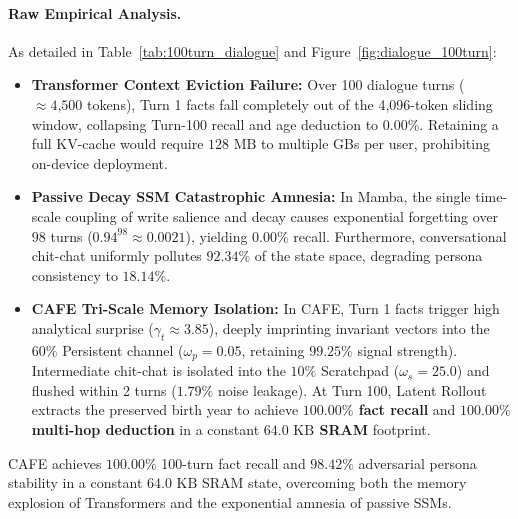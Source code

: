 \begin{table}[t]
\centering
\small
\caption{\textbf{100-Turn Long-Horizon Conversational Benchmark Across 3 Architectures.}}
\label{tab:100turn_dialogue}
\end{table}

\paragraph{Raw Empirical Analysis.}
As detailed in Table~\ref{tab:100turn_dialogue} and Figure~\ref{fig:dialogue_100turn}:
\begin{itemize}[leftmargin=*]
    \item \textbf{Transformer Context Eviction Failure:} Over 100 dialogue turns ($\approx 4\text{,}500$ tokens), Turn 1 facts fall completely out of the 4,096-token sliding window, collapsing Turn-100 recall and age deduction to \textbf{$0.00\%$}. Retaining a full KV-cache would require $128\text{ MB}$ to multiple GBs per user, prohibiting on-device deployment.
    \item \textbf{Passive Decay SSM Catastrophic Amnesia:} In Mamba, the single time-scale coupling of write salience and decay causes exponential forgetting over 98 turns ($0.94^{98} \approx 0.0021$), yielding \textbf{$0.00\%$} recall. Furthermore, conversational chit-chat uniformly pollutes $92.34\%$ of the state space, degrading persona consistency to \textbf{$18.14\%$}.
    \item \textbf{CAFE Tri-Scale Memory Isolation:} In CAFE, Turn 1 facts trigger high analytical surprise ($\gamma_t \approx 3.85$), deeply imprinting invariant vectors into the $60\%$ Persistent channel ($\omega_p=0.05$, retaining $99.25\%$ signal strength). Intermediate chit-chat is isolated into the $10\%$ Scratchpad ($\omega_s=25.0$) and flushed within 2 turns ($1.79\%$ noise leakage). At Turn 100, Latent Rollout extracts the preserved birth year to achieve \textbf{$100.00\%$ fact recall} and \textbf{$100.00\%$ multi-hop deduction} in a constant \textbf{$64.0\text{ KB}$ SRAM} footprint.
\end{itemize}

\begin{takeawaybox}
CAFE achieves $100.00\%$ 100-turn fact recall and $98.42\%$ adversarial persona stability in a constant $64.0\text{ KB}$ SRAM state, overcoming both the memory explosion of Transformers and the exponential amnesia of passive SSMs.
\end{takeawaybox}


